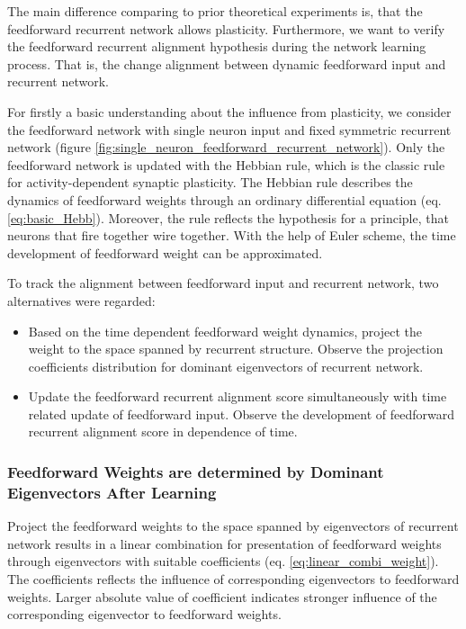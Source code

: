 \documentclass[11pt]{article}
\begin{document}
	The main difference comparing to prior theoretical experiments is, that the feedforward recurrent network allows plasticity. Furthermore, we want to verify the feedforward recurrent alignment hypothesis during the network learning process. That is, the change alignment between dynamic feedforward input and recurrent network. 
	
	For firstly a basic understanding about the influence from plasticity, we consider the feedforward network with single neuron input and fixed symmetric recurrent network (figure \ref{fig:single_neuron_feedforward_recurrent_network}). Only the feedforward network is updated with the Hebbian rule, which is the classic rule for activity-dependent synaptic plasticity. The Hebbian rule describes the dynamics of feedforward weights through an ordinary differential equation (eq. \ref{eq:basic_Hebb}). Moreover, the rule reflects the hypothesis for a principle, that neurons that fire together wire together. With the help of Euler scheme, the time development of feedforward weight can be approximated. 
	
	To track the alignment between feedforward input and recurrent network, two alternatives were regarded:
		\begin{itemize}
			\item Based on the time dependent feedforward weight dynamics, project the weight to the space spanned by recurrent structure. Observe the projection coefficients distribution for dominant eigenvectors of recurrent network.
			\item Update the feedforward recurrent alignment score simultaneously with time related update of feedforward input. Observe the development of feedforward recurrent alignment score in dependence of time. 
		\end{itemize}

	\subsubsection{Feedforward Weights are determined by Dominant Eigenvectors After Learning}
	
	Project the feedforward weights to the space spanned by eigenvectors of recurrent network results in a linear combination for presentation of feedforward weights through eigenvectors with suitable coefficients (eq. \ref{eq:linear_combi_weight}). The coefficients reflects the influence of corresponding eigenvectors to feedforward weights. Larger absolute value of coefficient indicates stronger influence of the corresponding eigenvector to feedforward weights. 
	
\end{document}
